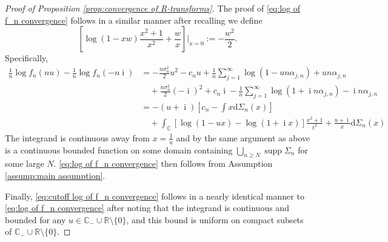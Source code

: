\documentclass[10pt,a4paper]{amsart}
\newcommand{\C}{\mathbb{C}}
\newcommand{\R}{\mathbb{R}}
\newcommand{\dd}{\mathrm{d}}
\DeclareMathOperator{\ii}{i}
\DeclareMathOperator{\supp}{supp}
\begin{document}
\begin{proof}[Proof of Proposition \ref{prop:convergence of R-transforms}]
	The proof of \eqref{eq:log of f_n convergence} follows in a similar manner after recalling we define $$\left[ \log(1-xw)\frac{x^2+1}{x^2}+\frac{w}{x}\right]\Big|_{x=0}:=-\frac{w^2}{2}.$$ Specifically, \begin{equation}
		\begin{aligned}
			\frac{1}{n}\log f_n(nu)-\frac{1}{n}\log f_{n}(-n\ii)&=-\frac{n\sigma_n^2}{2}u^2-c_nu+\frac{1}{n}\sum_{j=1}^{\infty}\log\left(1-un\alpha_{j,n}\right)+un\alpha_{j,n}\\
			&\quad+\frac{n\sigma_n^2}{2}(-\ii)^2+c_n\ii-\frac{1}{n}\sum_{j=1}^{\infty}\log\left(1+\ii n\alpha_{j,n}\right)-\ii n\alpha_{j,n}\\
			&=-(u+\ii)\left[c_n-\int x\dd\Sigma_{n}(x)\right]\\
			&\quad +\int_{\C}\left[\log(1-ux)-\log(1+\ii x)\right]\frac{x^2+1}{t^2}+\frac{u+\ii}{x}\dd\Sigma_{n}(x)
		\end{aligned}
	\end{equation} The integrand is continuous away from $x=\frac{1}{u}$ and by the same argument as above is  a continuous bounded function on some domain containing $\bigcup_{n\geq N}\supp\Sigma_{n}$ for some large $N$. \eqref{eq:log of f_n convergence} then follows from Assumption \ref{assump:main assumption}.
	
	Finally, \eqref{eq:cutoff log of f_n convergence} follows in a nearly identical manner to \eqref{eq:log of f_n convergence} after noting that the integrand is continuous and bounded for any $u\in\C_-\cup\R\setminus\{0\}$, and this bound is uniform on compact subsets of $\C_-\cup\R\setminus\{0\}$. 
\end{proof}
\end{document}
